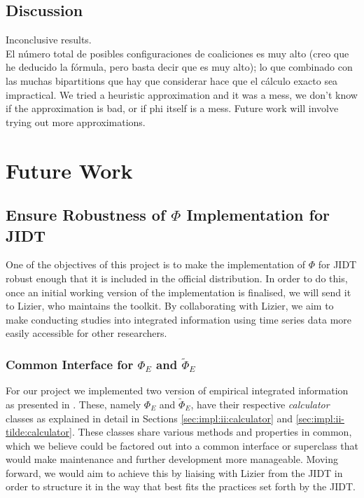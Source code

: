 \documentclass[a4paper,11pt]{article}
\begin{document}
\subsection{Discussion}
\label{sec:snn:disc}

Inconclusive results.\\
El número total de posibles configuraciones de coaliciones es muy alto (creo que he deducido la fórmula, pero basta decir que es muy alto); lo que combinado con las muchas bipartitions que hay que considerar hace que el cálculo exacto sea impractical. We tried a heuristic approximation and it was a mess, we don't know if the approximation is bad, or if phi itself is a mess. Future work will involve trying out more approximations.\\


\clearpage

\section{Future Work}
\label{sec:fw}

\subsection{Ensure Robustness of $\Phi$ Implementation for JIDT}
\label{sec:fw:jidt}
One of the objectives of this project is to make the implementation of $\Phi$ for JIDT robust enough that it is included in the official distribution. In order to do this, once an initial working version of the implementation is finalised, we will send it to Lizier, who maintains the toolkit. By collaborating with Lizier, we aim to make conducting studies into integrated information using time series data more easily accessible for other researchers.

\subsubsection{Common Interface for $\Phi_E$ and $\widetilde{\Phi}_E$}
\label{sec:fw:jidt:interface}
For our project we implemented two version of empirical integrated information as presented in \cite{Barrett2011}. These, namely $\Phi_E$ and $\widetilde{\Phi}_E$, have their respective \textit{calculator} classes as explained in detail in Sections \ref{sec:impl:ii:calculator} and \ref{sec:impl:ii-tilde:calculator}. These classes share various methods and properties in common, which we believe could be factored out into a common interface or superclass that would make maintenance and further development more manageable. Moving forward, we would aim to achieve this by liaising with Lizier from the JIDT in order to structure it in the way that best fits the practices set forth by the JIDT.
\end{document}
